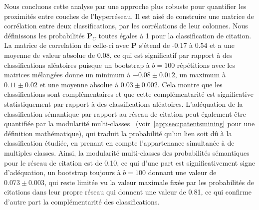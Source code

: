 {Nous concluons cette analyse par une approche plus robuste pour quantifier les proximités entre couches de l'hyperréseau. Il est aisé de construire une matrice de corrélation entre deux classifications, par les corrélations de leur colonnes. Nous définissons les probabilités $\mathbf{P}_C$ toutes égales à 1 pour la classification de citation. La matrice de correlation de celle-ci avec $\mathbf{P}$ s'étend de -0.17 à 0.54 et a une moyenne de valeur absolue de 0.08, ce qui est significatif par rapport à des classifications aléatoires puisque un bootstrap à $b=100$ répétitions avec les matrices mélangées donne un minimum à $-0.08 \pm 0.012$, un maximum à $0.11 \pm 0.02$ et une moyenne absolue à $0.03 \pm 0.002$. Cela montre que les classifications sont complémentaires et que cette complémentarité est significative statistiquement par rapport à des classifications aléatoires. L'adéquation de la classification sémantique par rapport au réseau de citation peut également être quantifiée par la modularité multi-classes~\cite{nicosia2009extending} (voir~\ref{app:sec:patentsmining} pour une définition mathématique), qui traduit la probabilité qu'un lien soit dû à la classification étudiée, en prenant en compte l'appartenance simultanée à de multiples classes. Ainsi, la modularité multi-classes des probabilités sémantiques pour le réseau de citation est de 0.10, ce qui d'une part est significativement signe d'adéquation, un bootstrap toujours à $b=100$ donnant une valeur de $0.073 \pm 0.003$, qui reste limitée vu la valeur maximale fixée par les probabilités de citations dans leur propre réseau qui donnent une valeur de 0.81, ce qui confirme d'autre part la complémentarité des classifications.
}












